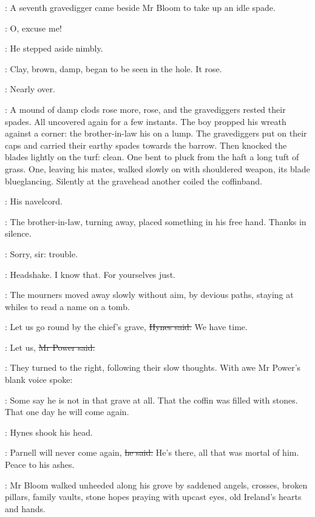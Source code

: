 :
A seventh gravedigger came beside Mr Bloom to take up an idle spade.

\Bloom:
O, excuse me!

:
He stepped aside nimbly.

:
Clay, brown, damp, began to be seen in the hole.
It rose.

\BloomInt:
Nearly over.

:
A mound of damp clods rose more, rose,
and the gravediggers rested their spades.
All uncovered again for a few instants.
The boy propped his wreath against a corner:
the brother-in-law his on a lump.
The gravediggers put on their caps
and carried their earthy spades towards the barrow.
Then knocked the blades lightly on the turf:
clean.
One bent to pluck from the haft a long tuft of grass.
One, leaving his mates, walked slowly on with shouldered weapon,
its blade blueglancing.
Silently at the gravehead
another coiled the coffinband.

\BloomInt:
His navelcord.

:
The brother-in-law, turning away,
placed something in his free hand.
Thanks in silence.

:
Sorry, sir:
trouble.

:
Headshake.
I know that.
For yourselves just.

:
The mourners moved away slowly without aim, by devious paths,
staying at whiles to read a name on a tomb.

\hynes:
Let us go round by the chief's grave,
\sout{Hynes said.}
We have time.

\power:
Let us,
\sout{Mr Power said.}

:
They turned to the right, following their slow thoughts.
With awe Mr Power's blank voice spoke:

\power:
Some say he is not in that grave at all.
That the coffin was filled with stones.
That one day he will come again.

:
Hynes shook his head.

\hynes:
Parnell will never come again,
\sout{he said.}
He's there, all that was mortal of him.
Peace to his ashes.

:
Mr Bloom walked unheeded along his grove
by saddened angels, crosses, broken pillars,
family vaults,
stone hopes praying with upcast eyes,
old Ireland's hearts and hands.

